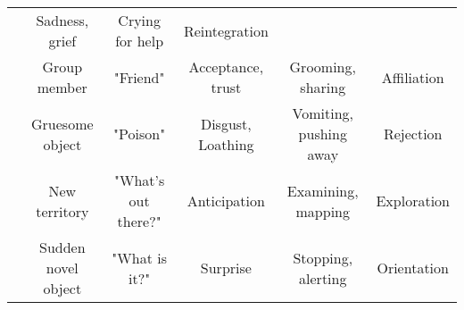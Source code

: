 \documentclass[landscape]{article}
\begin{document}
\begin{center}
\begin{tabular}{|l|c|c|c|c|c|}
& Sadness, grief 
	

& Crying for help 
	

& Reintegration\\ 

 
	
\definecolor{brightgreen}{RGB}{0,166,55}
{\color{brightgreen} \rule{0.3cm}{1cm}}

& Group member 
	

& "Friend" 
	

& Acceptance, trust 
	

& Grooming, sharing 
	

& Affiliation\\ 

 
	
\definecolor{softpurple}{RGB}{222,168,255}
{\color{softpurple} \rule{0.3cm}{1cm}}

& Gruesome object 
	

& "Poison" 
	

& Disgust, Loathing 
	

& Vomiting, pushing away 
	

& Rejection\\ 

 
\definecolor{brawn}{RGB}{145,80,0}
{\color{brawn} \rule{0.3cm}{1cm}}
	

& New territory 
	

& "What's out there?" 
	

& Anticipation 
	

& Examining, mapping 
	

& Exploration\\ 

 
\definecolor{blu}{RGB}{0,138,200}
{\color{blu} \rule{0.3cm}{1cm}}
	

& Sudden novel object 
	

& "What is it?" 
	

& Surprise 
	

& Stopping, alerting 
	

& Orientation\\ 

\hline
\end{tabular}
\endgroup
\end{center}
\end{document}
